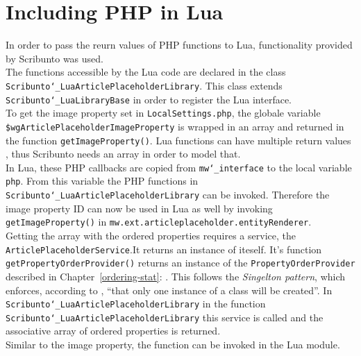 \section{Including PHP in Lua}\label{including-lua}

In order to pass the reurn values of PHP functions to Lua, functionality provided by Scribunto was used. \\
The functions accessible by the Lua code are declared in the class \texttt{\justify Scribunto\char`_LuaArticlePlaceholderLibrary}. This class extends \texttt{\justify Scribunto\char`_LuaLibraryBase} in order to register the Lua interface. \\
To get the image property set in \texttt{\justify LocalSettings.php}, the globale variable \texttt{\justify \$wgArticlePlaceholderImageProperty} is wrapped in an array and returned in the function \texttt{\justify getImageProperty()}. Lua functions can have multiple return values \citep{luabook:01}, thus Scribunto needs an array in order to model that. \\
In Lua, these PHP callbacks are copied from \texttt{\justify mw\char`_interface} to the local variable \texttt{php}. From this variable the PHP functions in \texttt{\justify Scribunto\char`_LuaArticlePlaceholderLibrary} can be invoked. Therefore the image property ID can now be used in Lua as well by invoking \texttt{\justify getImageProperty()} in \texttt{\justify mw.ext.articleplaceholder.entityRenderer}. \\
Getting the array with the ordered properties requires a service, the \texttt{ArticlePlaceholderService}.It returns an instance of iteself. It's function \texttt{\justify getPropertyOrderProvider()} returns an instance of the \texttt{\justify PropertyOrderProvider} described in Chapter~\ref{ordering-stat}: . This follows the \textit{Singelton pattern}, which enforces, according to \citet{designpattern}, ``that only one instance of a class will be created''.
In \texttt{\justify Scribunto\char`_LuaArticlePlaceholderLibrary} in the function \texttt{\justify Scribunto\char`_LuaArticlePlaceholderLibrary} this service is called and the associative array of ordered properties is returned.\\
Similar to the image property, the function can be invoked in the Lua module.
